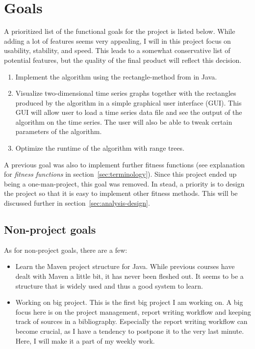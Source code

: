 
\section{Goals} \label{sec:goals}

A prioritized list of the functional goals for the project is listed below.
While adding a lot of features seems very appealing, I will in this project
focus on usability, stability, and speed. This leads to a somewhat conservative
list of potential features, but the quality of the final product will reflect
this decision. 

\begin{enumerate}
    \item Implement the algorithm using the rectangle-method from
    \cite{doerr2017a} in Java. 
    
    \item Visualize two-dimensional time series graphs together with the
    rectangles produced by the algorithm in a simple graphical user interface
    (GUI). This GUI will allow user to load a time series data file and see the
    output of the algorithm on the time series. The user will also be able to
    tweak certain parameters of the algorithm. 
    
    \item Optimize the runtime of the algorithm with range trees. 
\end{enumerate}

A previous goal was also to implement further fitness functions (see explanation
for \textit{fitness functions} in section~\ref{sec:terminology}). Since this
project ended up being a one-man-project, this goal was removed. In stead, a
priority is to design the project so that it is easy to implement other fitness
methods. This will be discussed further in section~\ref{sec:analysis-design}.


\subsection{Non-project goals} 

As for non-project goals, there are a few: 
\begin{itemize}
    \item Learn the Maven project structure for Java. While previous courses
    have dealt with Maven a little bit, it has never been fleshed out. It seems
    to be a structure that is widely used and thus a good system to learn. 

    \item Working on big project. This is the first big project I am working on.
    A big focus here is on the project management, report writing workflow and
    keeping track of sources in a bibliography. Especially the report writing
    workflow can become crucial, as I have a tendency to postpone it to the very
    last minute. Here, I will make it a part of my weekly work. 
\end{itemize}

